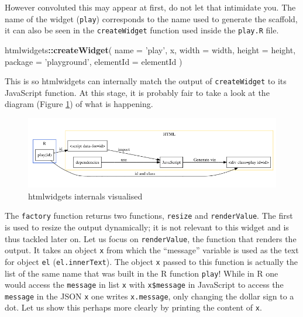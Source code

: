 \documentclass[10pt,]{krantz}
\makeatletter
\newenvironment{Shaded}{\begin{snugshade}}{\end{snugshade}}
\newcommand{\DataTypeTok}[1]{\textcolor[rgb]{0.27,0.27,0.27}{#1}}
\newcommand{\KeywordTok}[1]{\textcolor[rgb]{0.27,0.27,0.27}{\textbf{#1}}}
\newcommand{\NormalTok}[1]{#1}
\newcommand{\OperatorTok}[1]{\textcolor[rgb]{0.43,0.43,0.43}{\textbf{#1}}}
\newcommand{\StringTok}[1]{\textcolor[rgb]{0.5,0.5,0.5}{#1}}
\newenvironment{kframe}{%
\medskip{}
\setlength{\fboxsep}{.8em}
 \def\at@end@of@kframe{}%
 \ifinner\ifhmode%
  \def\at@end@of@kframe{\end{minipage}}%
  \begin{minipage}{\columnwidth}%
 \fi\fi%
 \def\FrameCommand##1{\hskip\@totalleftmargin \hskip-\fboxsep
 \colorbox{shadecolor}{##1}\hskip-\fboxsep
     \hskip-\linewidth \hskip-\@totalleftmargin \hskip\columnwidth}%
 \MakeFramed {\advance\hsize-\width
   \@totalleftmargin\z@ \linewidth\hsize
   \@setminipage}}%
 {\par\unskip\endMakeFramed%
 \at@end@of@kframe}
\renewenvironment{Shaded}{\begin{kframe}}{\end{kframe}}
\makeatother
\begin{document}
However convoluted this may appear at first, do not let that intimidate you. The name of the widget (\texttt{play}) corresponds to the name used to generate the scaffold, it can also be seen in the \texttt{createWidget} function used inside the \texttt{play.R} file.

\begin{Shaded}
\begin{Highlighting}[]
\NormalTok{htmlwidgets}\OperatorTok{::}\KeywordTok{createWidget}\NormalTok{(}
  \DataTypeTok{name =} \StringTok{'play'}\NormalTok{,}
\NormalTok{  x,}
  \DataTypeTok{width =}\NormalTok{ width,}
  \DataTypeTok{height =}\NormalTok{ height,}
  \DataTypeTok{package =} \StringTok{'playground'}\NormalTok{,}
  \DataTypeTok{elementId =}\NormalTok{ elementId}
\NormalTok{)}
\end{Highlighting}
\end{Shaded}

This is so htmlwidgets can internally match the output of \texttt{createWidget} to its JavaScript function. At this stage, it is probably fair to take a look at the diagram (Figure \ref{fig:widget-internals-diagram}) of what is happening.

\begin{figure}[H]

{\centering \includegraphics[width=1\linewidth]{images/03-htmlwidgets-internals} 

}

\caption{htmlwidgets internals visualised}\label{fig:widget-internals-diagram}
\end{figure}

The \texttt{factory} function returns two functions, \texttt{resize} and \texttt{renderValue}. The first is used to resize the output dynamically; it is not relevant to this widget and is thus tackled later on. Let us focus on \texttt{renderValue}, the function that renders the output. It takes an object \texttt{x} from which the ``message'' variable is used as the text for object \texttt{el} (\texttt{el.innerText}). The object \texttt{x} passed to this function is actually the list of the same name that was built in the R function \texttt{play}! While in R one would access the \texttt{message} in list \texttt{x} with \texttt{x\$message} in JavaScript to access the \texttt{message} in the JSON \texttt{x} one writes \texttt{x.message}, only changing the dollar sign to a dot. Let us show this perhaps more clearly by printing the content of \texttt{x}.
\end{document}
